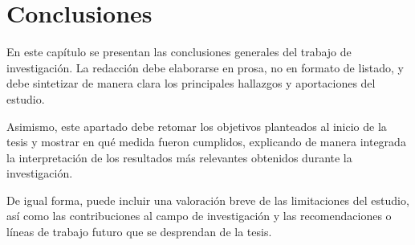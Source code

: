 \chapter{Conclusiones}

En este capítulo se presentan las conclusiones generales del trabajo de investigación. La redacción debe elaborarse en prosa, no en formato de listado, y debe sintetizar de manera clara los principales hallazgos y aportaciones del estudio.

Asimismo, este apartado debe retomar los objetivos planteados al inicio de la tesis y mostrar en qué medida fueron cumplidos, explicando de manera integrada la interpretación de los resultados más relevantes obtenidos durante la investigación.

De igual forma, puede incluir una valoración breve de las limitaciones del estudio, así como las contribuciones al campo de investigación y las recomendaciones o líneas de trabajo futuro que se desprendan de la tesis.

